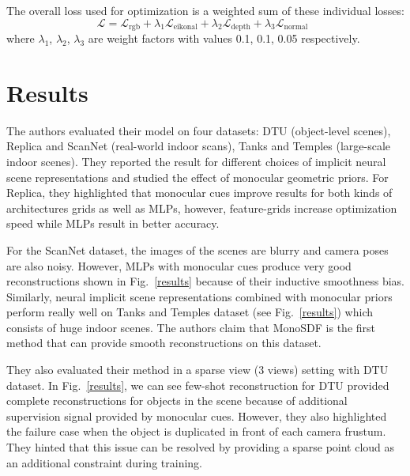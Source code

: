 \documentclass[a4paper]{paper}
\newcommand{\figref}[1]{Fig.~\ref{#1}}
\begin{document}
The overall loss used for optimization is a weighted sum of these individual losses:
\begin{equation}
    \mathcal{L} = \mathcal{L}_{\text{rgb}} + \lambda_1 \mathcal{L}_\text{eikonal} + \lambda_2\mathcal{L}_{\text{depth}} + \lambda_3\mathcal{L}_{\text{normal}} \enspace 
\end{equation}
where $\lambda_1$, $\lambda_2$, $\lambda_3$ are weight factors with values 0.1, 0.1, 0.05 respectively.

\section{Results}
The authors evaluated their model on four datasets: DTU (object-level scenes), Replica and ScanNet (real-world indoor scans), Tanks and Temples (large-scale indoor scenes). They reported the result for different choices of implicit neural scene representations and studied the effect of monocular geometric priors. For Replica, they highlighted that monocular cues improve results for both kinds of architectures grids as well as MLPs, however, feature-grids increase optimization speed while MLPs result in better accuracy. \newline

For the ScanNet dataset, the images of the scenes are blurry and camera poses are also noisy. However, MLPs with monocular cues produce very good reconstructions shown in \figref{results} because of their inductive smoothness bias. Similarly, neural implicit scene representations combined with monocular priors perform really well on Tanks and Temples dataset (see \figref{results}) which consists of huge indoor scenes. The authors claim that MonoSDF is the first method that can provide smooth reconstructions on this dataset. \newline

They also evaluated their method in a sparse view (3 views) setting with DTU dataset. In \figref{results}, we can see few-shot reconstruction for DTU provided complete reconstructions for objects in the scene because of additional supervision signal provided by monocular cues. However, they also highlighted the failure case when the object is duplicated in front of each camera frustum. They hinted that this issue can be resolved by providing a sparse point cloud as an additional constraint during training.
\end{document}
